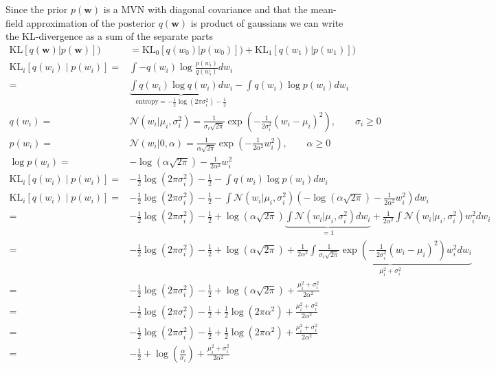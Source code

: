 \documentclass{article}
\begin{document}
Since the prior $p(\mathbf{w})$ is a MVN with diagonal covariance and that the mean-field approximation of the posterior $q(\mathbf{w})$ is product of gaussians we can write the KL-divergence as a sum of the separate parts
\begin{align}
	\text{KL}\left[q(\mathbf{w})| p(\mathbf{w})\right]) &= \text{KL}_0\left[q(w_0)| p(w_0)\right]) + \text{KL}_1\left[q(w_1)| p(w_1)\right]) \\
	\text{KL}_i[q(w_i)\mid p(w_i)] =& \int -q(w_i) \log\frac{p(w_i)}{q(w_i)} dw_i \\
	=& \underbrace{\int q(w_i) \log q(w_i) dw_i}_{\text{entropy} = -\frac{1}{2}\log(2\pi\sigma_i^2)-\frac{1}{2}} - \int q(w_i) \log p(w_i) dw_i \\
	q(w_i) =& \mathcal{N}(w_i | \mu_i,\sigma_i^2) = \frac{1}{\sigma_i \sqrt{2\pi}}\exp(-\frac{1}{2\sigma_i^2}(w_i-\mu_i)^2), \qquad \sigma_i \geq 0 \\
	p(w_i) =& \mathcal{N}(w_i | 0,\alpha) =\frac{1}{\alpha \sqrt{2\pi}} \exp(-\frac{1}{2\alpha^2}w_i^2) , \qquad \alpha \geq 0\\
	\log p(w_i) =&-\log(\alpha \sqrt{2\pi}) -\frac{1}{2\alpha^2}w_i^2 \\
	\text{KL}_i[q(w_i)\mid p(w_i)] =& -\frac{1}{2}\log(2\pi\sigma_i^2)-\frac{1}{2}- \int q(w_i) \log p(w_i) dw_i \\
	\text{KL}_i[q(w_i)\mid p(w_i)] =& -\frac{1}{2}\log(2\pi\sigma_i^2)-\frac{1}{2}- \int \mathcal{N}(w_i | \mu_i,\sigma_i^2) \left(  -\log(\alpha \sqrt{2\pi}) -\frac{1}{2\alpha^2}w_i^2\right)  dw_i \\
	=& -\frac{1}{2}\log(2\pi\sigma_i^2)-\frac{1}{2} + \log(\alpha \sqrt{2\pi})\underbrace{\int \mathcal{N}(w_i | \mu_i,\sigma_i^2)dw_i}_{=1} +\frac{1}{2\alpha^2}\int \mathcal{N}(w_i | \mu_i,\sigma_i^2)w_i^2  dw_i \\
	=& -\frac{1}{2}\log(2\pi\sigma_i^2)-\frac{1}{2} + \log(\alpha \sqrt{2\pi}) +\frac{1}{2\alpha^2}\underbrace{\int \frac{1}{\sigma_i \sqrt{2\pi}}\exp(-\frac{1}{2\sigma_i^2}(w_i-\mu_i)^2)w_i^2  dw_i}_{\mu_i^2+\sigma_i^2} \\
	=& -\frac{1}{2}\log(2\pi\sigma_i^2)-\frac{1}{2} + \log(\alpha \sqrt{2\pi}) +\frac{\mu_i^2+\sigma_i^2}{2\alpha^2} \\
	=& -\frac{1}{2}\log(2\pi\sigma_i^2)-\frac{1}{2} + \frac{1}{2}\log( 2\pi \alpha^2) +\frac{\mu_i^2+\sigma_i^2}{2\alpha^2}  \\
	=& -\frac{1}{2}\log(2\pi\sigma_i^2)-\frac{1}{2} + \frac{1}{2}\log( 2\pi \alpha^2) +\frac{\mu_i^2+\sigma_i^2}{2\alpha^2}  \\
	=& -\frac{1}{2} + \log(\frac{\alpha}{\sigma_i}) +\frac{\mu_i^2+\sigma_i^2}{2\alpha^2}  \\
\end{align}
\end{document}
